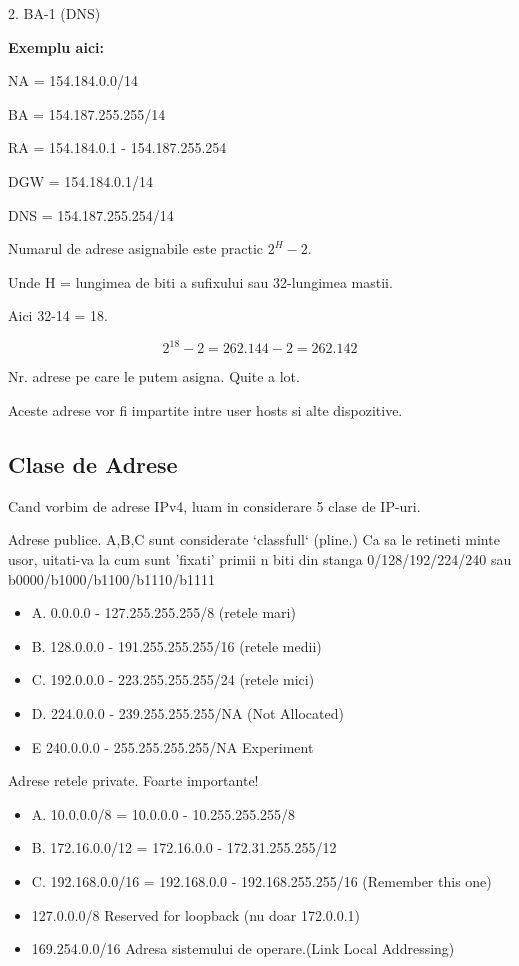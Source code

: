 \documentclass{article}
\begin{document}
2. BA-1 (DNS)

\textbf{Exemplu aici:}
\begin{center}
    NA = 154.184.0.0/14
    
    BA = 154.187.255.255/14
    
    RA = 154.184.0.1 - 154.187.255.254

    DGW = 154.184.0.1/14

    DNS = 154.187.255.254/14
\end{center}

Numarul de adrese asignabile este practic $2^{H}-2$. 

Unde H = lungimea de biti a sufixului sau 32-lungimea mastii.

Aici 32-14 = 18.

    \[2^{18}-2 = 262.144-2 = 262.142\] 

Nr. adrese pe care le putem asigna. Quite a lot.

Aceste adrese vor fi impartite intre user hosts si alte dispozitive.




\subsection{Clase de Adrese}

Cand vorbim de adrese IPv4, luam in considerare 5 clase de IP-uri.

Adrese publice. A,B,C sunt considerate `classfull` (pline.)
Ca sa le retineti minte usor, uitati-va la cum sunt 'fixati' primii n biti din stanga 0/128/192/224/240 sau b0000/b1000/b1100/b1110/b1111
\begin{itemize}
    \item A.    0.0.0.0 - 127.255.255.255/8 (retele mari)
    \item B.    128.0.0.0 - 191.255.255.255/16 (retele medii)
    \item C.    192.0.0.0 - 223.255.255.255/24 (retele mici)
    \item D.    224.0.0.0 - 239.255.255.255/NA (Not Allocated)
    \item E 240.0.0.0 - 255.255.255.255/NA Experiment
\end{itemize}

Adrese retele private. Foarte importante!
\begin{itemize}
    \item A.    10.0.0.0/8 = 10.0.0.0 - 10.255.255.255/8
    \item B.    172.16.0.0/12 = 172.16.0.0 - 172.31.255.255/12
    \item C.    192.168.0.0/16 = 192.168.0.0 - 192.168.255.255/16 (Remember this one)
    \item 127.0.0.0/8 Reserved for loopback (nu doar 172.0.0.1)
    \item 169.254.0.0/16 Adresa sistemului de operare.(Link Local Addressing)
\end{itemize}
\end{document}
